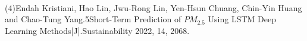 \documentclass[preview]{standalone}
\begin{document}
\begin{center}
\quad\\(4)Endah Kristiani, Hao Lin, Jwu-Rong Lin, Yen-Hsun Chuang, Chin-Yin Huang and Chao-Tung Yang.5Short-Term Prediction of $PM_{2.5}$ Using LSTM Deep Learning Methods[J].Sustainability 2022, 14, 2068.\quad\\
\end{center}
\end{document}
